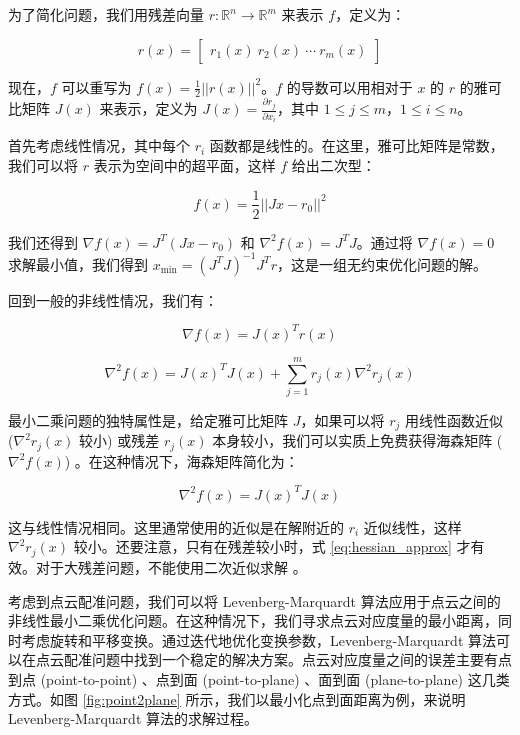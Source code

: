 为了简化问题，我们用残差向量 $r : \mathbb{R}^n \rightarrow \mathbb{R}^m$ 来表示 $f$，定义为：

\begin{equation}
r(x) =
\begin{bmatrix}
r_1(x) \
r_2(x) \
\cdots \
r_m(x)
\end{bmatrix}
\end{equation}

现在，$f$ 可以重写为 $f(x) = \frac{1}{2} ||r(x)||^2$。$f$ 的导数可以用相对于 $x$ 的 $r$ 的雅可比矩阵 $J(x)$ 来表示，定义为 $J(x) = \frac{\partial r_j}{\partial x_i}$，其中 $1 \leq j \leq m$，$1 \leq i \leq n$。

首先考虑线性情况，其中每个 $r_i$ 函数都是线性的。在这里，雅可比矩阵是常数，我们可以将 $r$ 表示为空间中的超平面，这样 $f$ 给出二次型：

\begin{equation}
f(x) = \frac{1}{2} ||Jx - r_0||^2
\end{equation}

我们还得到 $\nabla f(x) = J^T(Jx - r_0)$ 和 $\nabla^2 f(x) = J^TJ$。通过将 $\nabla f(x) = 0$ 求解最小值，我们得到 $x_\text{min} = (J^TJ)^{-1}J^Tr$，这是一组无约束优化问题的解。

回到一般的非线性情况，我们有：

\begin{equation}
\nabla f(x) = J(x)^T r(x)
\label{eq:grad}
\end{equation}

\begin{equation}
\nabla^2 f(x) = J(x)^TJ(x) + \sum_{j=1}^{m} r_j(x) \nabla^2 r_j(x)
\label{eq:hessian}
\end{equation}

最小二乘问题的独特属性是，给定雅可比矩阵 $J$，如果可以将 $r_j$ 用线性函数近似 ($\nabla^2 r_j(x)$ 较小) 或残差 $r_j(x)$ 本身较小，我们可以实质上免费获得海森矩阵 ($\nabla^2 f(x)$) 。在这种情况下，海森矩阵简化为：

\begin{equation}
\nabla^2 f(x) = J(x)^T J(x)
\label{eq:hessian_approx}
\end{equation}

这与线性情况相同。这里通常使用的近似是在解附近的 $r_i$ 近似线性，这样 $\nabla^2 r_j(x)$ 较小。还要注意，只有在残差较小时，式 \ref{eq:hessian_approx} 才有效。对于大残差问题，不能使用二次近似求解\cite{李娇娇2022基于深度学习的} 。

考虑到点云配准问题，我们可以将 Levenberg-Marquardt 算法应用于点云之间的非线性最小二乘优化问题。在这种情况下，我们寻求点云对应度量的最小距离，同时考虑旋转和平移变换。通过迭代地优化变换参数，Levenberg-Marquardt 算法可以在点云配准问题中找到一个稳定的解决方案。点云对应度量之间的误差主要有点到点 (point-to-point) 、点到面 (point-to-plane) 、面到面 (plane-to-plane) 这几类方式。如图 \ref{fig:point2plane} 所示，我们以最小化点到面距离为例，来说明 Levenberg-Marquardt 算法的求解过程。

